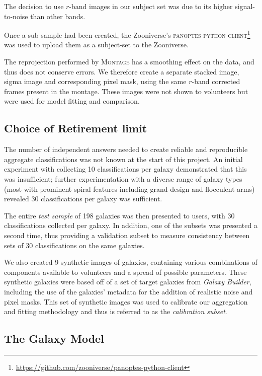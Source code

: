 \documentclass[../main.tex]{subfiles}
\begin{document}
The decision to use $r$-band images in our subject set was due to its higher signal-to-noise than other bands.

Once a sub-sample had been created, the Zooniverse's \textsc{panoptes-python-client}\footnote{\url{https://github.com/zooniverse/panoptes-python-client}} was used to upload them as a subject-set to the Zooniverse.

The reprojection performed by \textsc{Montage} has a smoothing effect on the data, and thus does not conserve errors. We therefore create a separate stacked image, sigma image and corresponding pixel mask, using the same $r$-band corrected frames present in the montage. These images were not shown to volunteers but were used for model fitting and comparison.

\subsection{Choice of Retirement limit}
\label{sec:retirement-limit}

The number of independent answers needed to create reliable and reproducible aggregate classifications was not known at the start of this project. An initial experiment with collecting 10 classifications per galaxy demonstrated that this was insufficient; further experimentation with a diverse range of galaxy types (most with prominent spiral features including grand-design and flocculent arms) revealed 30 classifications per galaxy was sufficient.

The entire {\it test sample} of 198 galaxies was then presented to users, with 30 classifications collected per galaxy. In addition, one of the subsets was presented a second time, thus providing a validation subset to measure consistency between sets of 30 classifications on the same galaxies.

We also created 9 synthetic images of galaxies, containing various combinations of components available to volunteers and a spread of possible parameters. These synthetic galaxies were based off of a set of target galaxies from \textit{Galaxy Builder}, including the use of the galaxies' metadata for the addition of realistic noise and pixel masks. This set of synthetic images was used to calibrate our aggregation and fitting methodology and thus is referred to as the \textit{calibration subset}.

\subsection{The Galaxy Model}
\label{section:galaxy-model}
\end{document}
